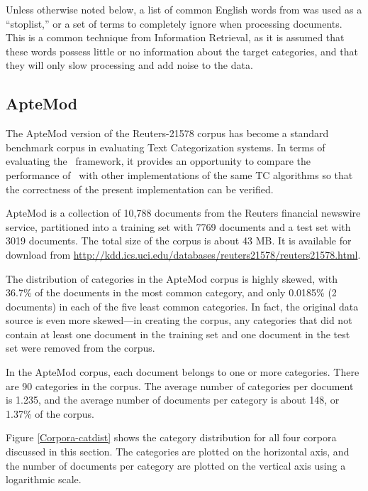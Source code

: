 Unless otherwise noted below, a list of common English words from
\cite{salton:89} was used as a ``stoplist,'' or a set of terms to
completely ignore when processing documents.  This is a common technique from
Information Retrieval,\cite[ch. XXX]{manning:99} as it is assumed that these words
possess little or no information about the target categories, and that
they will only slow processing and add noise to the data.


\subsection{ApteMod}


The ApteMod version of the Reuters-21578 corpus has become a standard
benchmark corpus in evaluating Text Categorization
systems. \cite{yang:99,joachims:98} In terms of evaluating the \aicat\
framework, it provides an opportunity to compare the performance of
\aicat\ with other implementations of the same TC algorithms so that
the correctness of the present implementation can be verified.

ApteMod is a collection of 10,788 documents from the Reuters financial
newswire service, partitioned into a training set with 7769
documents and a test set with 3019 documents.  The total size of the
corpus is about 43 MB.  It is available for download from
\url{http://kdd.ics.uci.edu/databases/reuters21578/reuters21578.html}.

The distribution of categories in the ApteMod corpus is highly skewed,
with 36.7\% of the documents in the most common category, and only
0.0185\% (2 documents) in each of the five least common categories.
In fact, the original data source is even more skewed---in creating
the corpus, any categories that did not contain at least one document
in the training set and one document in the test set were removed from
the corpus. \cite{yang:99}

In the ApteMod corpus, each document belongs to one or more
categories.  There are 90 categories in the corpus.  The average
number of categories per document is 1.235, and the average number of
documents per category is about 148, or 1.37\% of the corpus.

Figure \ref{Corpora-catdist} shows the category distribution for all
four corpora discussed in this section.  The categories are plotted on
the horizontal axis, and the number of documents per category are
plotted on the vertical axis using a logarithmic scale.

